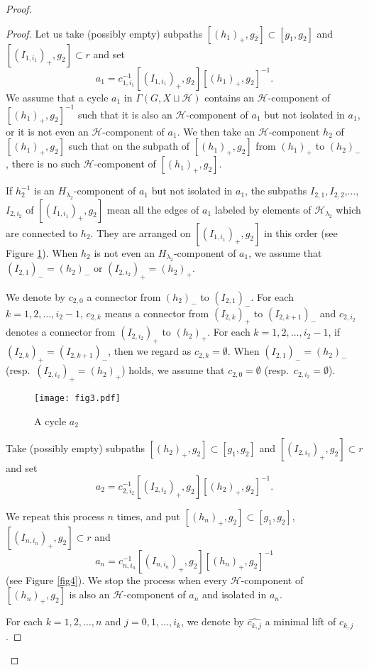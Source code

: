 \documentclass{amsart}
\theoremstyle{definition}
\begin{document}
\begin{proof}
\begin{proof}
Let us take (possibly empty) subpaths $[(h_{1})_+,g_2]\subset [g_1,g_2]$ and $[(I_{1,i_1})_+,g_2]\subset r$ and set 
$$
a_1=c_{1,i_1}^{-1}[(I_{1,i_1})_+,g_2][(h_{1})_+,g_2]^{-1}.
$$ 
We assume that a cycle $a_1$ in $\Gamma(G,X\sqcup{\mathcal H})$ contains an ${\mathcal H}$-component of $[(h_1)_+,g_2]^{-1}$ such that it is also an ${\mathcal H}$-component of $a_1$ but not isolated in $a_1$, or it is not even an ${\mathcal H}$-component of $a_1$. 
We then take an ${\mathcal H}$-component $h_2$ of $[(h_1)_+,g_2]$ such that on the subpath of $[(h_1)_+,g_2]$ from $(h_1)_+$ to $(h_2)_-$, there is no such ${\mathcal H}$-component of $[(h_{1})_+,g_2]$. 

If $h_2^{-1}$ is an $H_{\lambda_2}$-component of $a_1$ but not isolated in $a_1$, the subpaths $I_{2,1}, I_{2,2}$,$\ldots$, $I_{2,i_2}$ of $[(I_{1,i_1})_+,g_2]$ mean all the edges of $a_1$ labeled by elements of ${\mathcal H}_{\lambda_2}$ which are connected to $h_2$. 
They are arranged on $[(I_{1,i_1})_+,g_2]$ in this order (see Figure \ref{fig3}). 
When $h_2$ is not even an $H_{\lambda_{2}}$-component of $a_1$, we assume that $(I_{2,1})_-=(h_2)_-$ or $(I_{2,i_2})_+=(h_2)_+$. 

We denote by $c_{2,0}$ a connector from $(h_2)_-$ to $(I_{2,1})_-$. 
For each $k=1,2,\ldots,i_2-1$, $c_{2,k}$ means a connector from $(I_{2,k})_+$ to $(I_{2,k+1})_-$ and $c_{2,i_2}$ denotes a connector from $(I_{2,i_2})_+$ to $(h_2)_+$. 
For each $k=1,2,\ldots,i_2-1$, if $(I_{2,k})_+=(I_{2,k+1})_-$, then we regard as $c_{2,k}=\emptyset$. 
When $(I_{2,1})_-=(h_2)_-$ (resp.\ $(I_{2,i_2})_+=(h_2)_+$) holds, we assume that $c_{2,0}=\emptyset$ (resp.\ $c_{2,i_2}=\emptyset$). 
\begin{figure}[top]
\begin{center}
\texttt{[image: fig3.pdf]}
\end{center}
\caption{A cycle $a_2$}
\label{fig3}
\end{figure}
Take (possibly empty) subpaths $[(h_2)_+,g_2]\subset [g_1,g_2]$ and $[(I_{2,i_2})_+,g_2]\subset r$ and set 
$$
a_2=c_{2,i_2}^{-1}[(I_{2,i_2})_+,g_2][(h_{2})_+,g_2]^{-1}. 
$$

We repeat this process $n$ times, and put $[(h_n)_+,g_2]\subset [g_1,g_2]$, $[(I_{n,i_n})_+,g_2]\subset r$ and 
$$
a_n=c_{n,i_n}^{-1}[(I_{n,i_n})_+,g_2][(h_{n})_+,g_2]^{-1}
$$
(see Figure \ref{fig4}). 
We stop the process when every ${\mathcal H}$-component of $[(h_n)_+,g_2]$ is also an ${\mathcal H}$-component of $a_n$ and isolated in $a_n$.

For each $k=1,2,\ldots, n$ and $j=0,1,\ldots,i_k$, we denote by $\widehat{c_{k,j}}$ a minimal lift of $c_{k,j}$. 


\end{proof}
\end{proof}
\end{document}
